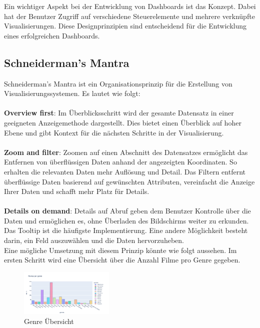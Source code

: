 \documentclass{article}
\begin{document}
Ein wichtiger Aspekt bei der Entwicklung von Dashboards ist das Konzept. Dabei hat der Benutzer Zugriff auf verschiedene Steuerelemente und mehrere verknüpfte Visualisierungen. Diese Designprinzipien sind entscheidend für die Entwicklung eines erfolgreichen Dashboards.

\subsection{Schneiderman’s Mantra}
Schneiderman's Mantra ist ein Organisationsprinzip für die Erstellung von Visualisierungssystemen. Es lautet wie folgt:\\ \\
\noindent
\textbf{Overview first}: Im Überblicksschritt wird der gesamte Datensatz in einer geeigneten Anzeigemethode dargestellt. Dies bietet einen Überblick auf hoher Ebene und gibt Kontext für die nächsten Schritte in der Visualisierung.\\ \\
\textbf{Zoom and filter}: Zoomen auf einen Abschnitt des Datensatzes ermöglicht das Entfernen von überflüssigen Daten anhand der angezeigten Koordinaten. So erhalten die relevanten Daten mehr Auflösung und Detail. Das Filtern entfernt überflüssige Daten basierend auf gewünschten Attributen, vereinfacht die Anzeige Ihrer Daten und schafft mehr Platz für Details.\\ \\
\textbf{Details on demand}: Details auf Abruf geben dem Benutzer Kontrolle über die Daten und ermöglichen es, ohne Überladen des Bildschirms weiter zu erkunden. Das Tooltip ist die häufigste Implementierung. Eine andere Möglichkeit besteht darin, ein Feld auszuwählen und die Daten hervorzuheben.\cite{hampdatavisualization_schneidermans_2016}
\\
Eine mögliche Umsetzung mit diesem Prinzip könnte wie folgt aussehen. Im ersten Schritt wird eine Übersicht über die Anzahl Filme pro Genre gegeben.


\begin{figure}[!h]
\centering
\includegraphics[width=0.4\textwidth]{img/movies_genre.png}
\caption{\label{fig: LE2 Schneiderman Overview} Genre Übersicht}
\end{figure}
\end{document}
